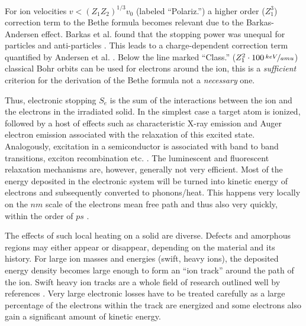 For ion velocities $v < (Z_1Z_2)^{1/3}v_0$ (labeled ``Polariz.'') a higher order ($Z_1^3$) correction term to the Bethe formula becomes relevant due to the Barkas-Andersen effect. Barkas et al. found that the stopping power was unequal for particles and anti-particles \cite{smith_measurements_1953}. This leads to a charge-dependent correction term quantified by Andersen et al. \cite{andersen_experimental_1969,sigmund_notes_2014}. Below the line marked ``Class.'' ($Z_1^2\cdot 100\,\nicefrac{keV}{amu}$) classical Bohr orbits can be used for electrons around the ion, this is a \emph{sufficient} criterion for the derivation of the Bethe formula not a \emph{necessary} one.

Thus, electronic stopping $S_e$ is the sum of the interactions between the ion and the electrons in the irradiated solid. In the simplest case a target atom is ionized, followed by a host of effects such as characteristic X-ray emission and Auger electron emission associated with the relaxation of this excited state. Analogously, excitation in a semiconductor is associated with band to band transitions, exciton recombination etc. \cite{wiedemann_uber_1888,boden_ionoluminescence_2012}. The luminescent and fluorescent relaxation mechanisms are, however, generally not very efficient. Most of the energy deposited in the electronic system will be turned into kinetic energy of electrons and subsequently converted to phonons/heat. This happens very locally on the $nm$ scale of the electrons mean free path and thus also very quickly, within the order of $ps$ \cite{toulemonde_transient_1992, nastasi/mayer/hirvonen_ion-solid_2008}. 


The effects of such local heating on a solid are diverse. Defects and amorphous regions may either appear or disappear, depending on the material and its history. For large ion masses and energies (swift, heavy ions), the deposited energy density becomes large enough to form an ``ion track'' around the path of the ion. Swift heavy ion tracks are a whole field of research outlined well by references \cite{toulemonde_transient_1992,miotello_revisiting_1997,wesch_effect_2004}. Very large electronic losses have to be treated carefully as a large percentage of the electrons within the track are energized and some electrons also gain a significant amount of kinetic energy. 

